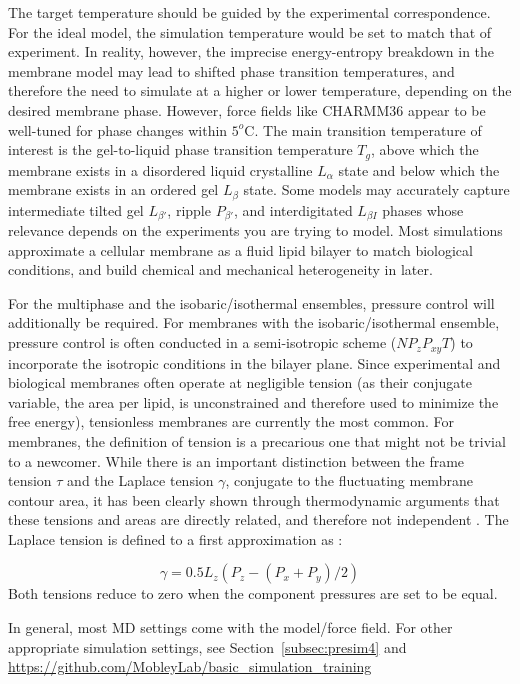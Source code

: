 \documentclass[9pt,bestpractices]{livecoms}
\begin{document}
The target temperature should be guided by the experimental correspondence.
For the ideal model, the simulation temperature would be set to match that of experiment.
In reality, however, the imprecise energy-entropy breakdown in the membrane model may lead to shifted phase transition temperatures, and therefore the need to simulate at a higher or lower temperature, depending on the desired membrane phase.
However, force fields like CHARMM36 \cite{Klauda2010d} appear to be well-tuned for phase changes within $5^o$C.
The main transition temperature of interest is the gel-to-liquid phase transition temperature $T_g$, above which the membrane exists in a disordered liquid crystalline $L_\alpha$ state and below which the membrane exists in an ordered gel $L_\beta$ state.
Some models may accurately capture intermediate tilted gel $L_{\beta '}$, ripple $P_{\beta '}$, and interdigitated $L_{\beta I}$ phases whose relevance depends on the experiments you are trying to model.
Most simulations approximate a cellular membrane as a fluid lipid bilayer to match biological conditions, and build chemical and mechanical heterogeneity in later.

For the multiphase and the isobaric/isothermal ensembles, pressure control will additionally be required.
For membranes with the isobaric/isothermal ensemble, pressure control is often conducted in a semi-isotropic scheme ($NP_{z}P_{xy}T$) to incorporate the isotropic conditions in the bilayer plane.
Since experimental and biological membranes often operate at negligible tension (as their conjugate variable, the area per lipid, is unconstrained and therefore used to minimize the free energy), tensionless membranes are currently the most common.
For membranes, the definition of tension is a precarious one that might not be trivial to a newcomer.
While there is an important distinction between the frame tension $\tau$ and the Laplace tension $\gamma$, conjugate to the fluctuating membrane contour area, it has been clearly shown through thermodynamic arguments that these tensions and areas are directly related, and therefore not independent \cite{Diamant2011}.
The Laplace tension is defined to a first approximation as \cite{Kirkwood1949}:

\begin{equation}\label{eq:1}
	\gamma =0.5 L_z(P_z-(P_x+P_y)/2)
\end{equation}
Both tensions reduce to zero when the component pressures are set to be equal.

In general, most MD settings come with the model/force field. For other appropriate simulation settings, see Section~\ref{subsec:presim4} and \url{https://github.com/MobleyLab/basic_simulation_training}
\end{document}
